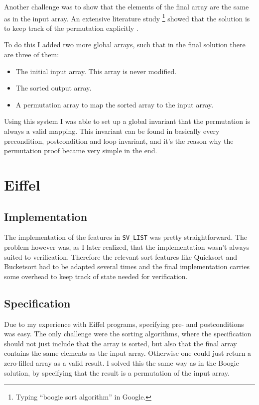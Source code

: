 \documentclass[a4paper,10pt]{article}
\begin{document}
Another challenge was to show that the elements of the final array are the same as in the input array.
An extensive literature study \footnote{Typing ``boogie sort algorithm'' in Google.} showed that the solution is to 
keep track of the permutation explicitly \cite{web:boogie:bubblesort}.

To do this I added two more global arrays, such that in the final solution there are three of them:
\begin{itemize}
 \item The initial input array. This array is never modified.
 \item The sorted output array.
 \item A permutation array to map the sorted array to the input array.
\end{itemize}

Using this system I was able to set up a global invariant that the permutation is always a valid mapping.
This invariant can be found in basically every precondition, postcondition and loop invariant, and it's the reason why the permutation proof became very simple in the end.

\section{Eiffel}

\subsection{Implementation}

The implementation of the features in \lstinline!SV_LIST! was pretty straightforward.
The problem however was, as I later realized, that the implementation wasn't always suited to verification.
Therefore the relevant sort features like Quicksort and Bucketsort had to be adapted several times 
and the final implementation carries some overhead to keep track of state needed for verification.

\subsection{Specification}

Due to my experience with Eiffel programs, specifying pre- and postconditions was easy.
The only challenge were the sorting algorithms, where the specification should not just include that the array is sorted,
but also that the final array contains the same elements as the input array.
Otherwise one could just return a zero-filled array as a valid result.
I solved this the same way as in the Boogie solution, by specifying that the result is a permutation of the input array.
\end{document}
